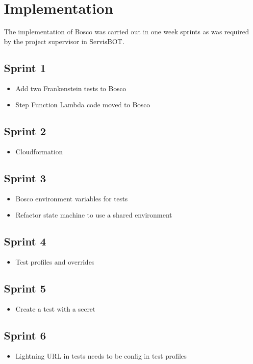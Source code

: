 \documentclass[12pt,a4paper,titlepage]{report}
\begin{document}
\section{Implementation}
The implementation of Bosco was carried out in one week sprints as was required by the project supervisor in ServisBOT\@. 
\subsection*{Sprint 1}
\begin{itemize}
\item Add two Frankenstein tests to Bosco
\item Step Function Lambda code moved to Bosco
\end{itemize}

\subsection*{Sprint 2}
\begin{itemize}
\item Cloudformation
\end{itemize}

\subsection*{Sprint 3}
\begin{itemize}
\item Bosco environment variables for tests
\item Refactor state machine to use a shared environment
\end{itemize}

\subsection*{Sprint 4}
\begin{itemize}
\item Test profiles and overrides
\end{itemize}

\subsection*{Sprint 5}
\begin{itemize}
\item Create a test with a secret
\end{itemize}

\subsection*{Sprint 6}
\begin{itemize}
\item Lightning URL in tests needs to be config in test profiles
\end{itemize}
\end{document}
